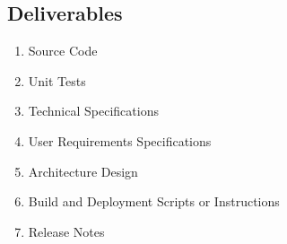 \subsection{Deliverables}
\small
\begin{enumerate}
\item Source Code
\item Unit Tests
\item Technical Specifications
\item User Requirements Specifications
\item Architecture Design
\item Build and Deployment Scripts or Instructions 
\item Release Notes
\end{enumerate}
